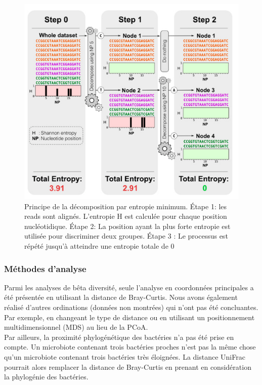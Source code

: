 \documentclass[12pt,a4paper]{article}
\begin{document}
\begin{figure}
\begin{center}
\includegraphics[scale=0.7]{img/entropy.png}\hfill
\end{center}
\caption{Principe de la décomposition par entropie minimum\cite{Bobadilla2015}. Étape 1: les reads sont alignés. L'entropie H est calculée pour chaque position nucléotidique. Étape 2: La position ayant la plus forte entropie est utilisée pour discriminer deux groupes. Étape 3 : Le processus est répété jusqu'à atteindre une entropie totale de 0 }
\label{entropy}
\end{figure}
\subsubsection{Méthodes d'analyse}
Parmi les analyses de bêta diversité, seule l'analyse en coordonnées principales a été présentée en utilisant la distance de Bray-Curtis.
Nous avons également réalisé d'autres ordinations (données non montrées) qui n'ont pas été concluantes. Par exemple, en changeant le type de distance ou en utilisant un positionnement multidimensionnel (MDS) au lieu de la PCoA. \\
Par ailleurs, la proximité phylogénétique des bactéries n'a pas été prise en compte. Un microbiote contenant trois bactéries proches n'est pas la même chose qu'un microbiote contenant trois bactéries très éloignées.
La distance UniFrac\cite{Lozupone2005} pourrait alors remplacer la distance de Bray-Curtis en prenant en considération la phylogénie des bactéries.
\end{document}
